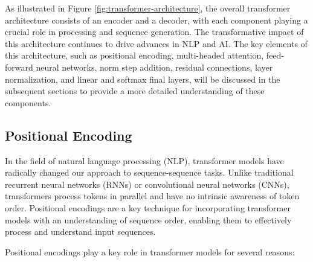 As illustrated in Figure \ref{fig:transformer-architecture}, the overall transformer architecture consists of an encoder and a decoder, with each component playing a crucial role in processing and sequence generation. The transformative impact of this architecture continues to drive advances in NLP and AI. The key elements of this architecture, such as positional encoding, multi-headed attention, feed-forward neural networks, norm step addition, residual connections, layer normalization, and linear and softmax final layers, will be discussed in the subsequent sections to provide a more detailed understanding of these components.

\subsection{Positional Encoding}

In the field of natural language processing (NLP), transformer models have radically changed our approach to sequence-sequence tasks. Unlike traditional recurrent neural networks (RNNs) or convolutional neural networks (CNNs), transformers process tokens in parallel and have no intrinsic awareness of token order. Positional encodings are a key technique for incorporating transformer models with an understanding of sequence order, enabling them to effectively process and understand input sequences. \cite{li2023transformer}

Positional encodings play a key role in transformer models for several reasons:

